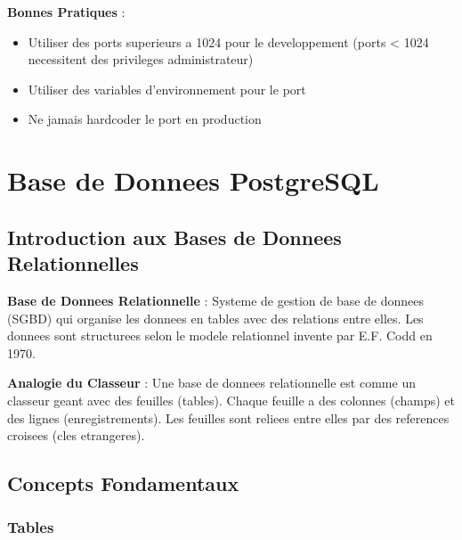 \documentclass[a4paper,12pt]{book}
\begin{document}
\begin{bestpracticebox}
    \textbf{Bonnes Pratiques} :
    \begin{itemize}
        \item Utiliser des ports superieurs a 1024 pour le developpement (ports < 1024 necessitent des privileges administrateur)
        \item Utiliser des variables d'environnement pour le port
        \item Ne jamais hardcoder le port en production
    \end{itemize}
\end{bestpracticebox}

\chapter{Base de Donnees PostgreSQL}

\section{Introduction aux Bases de Donnees Relationnelles}

\begin{definitionbox}
    \textbf{Base de Donnees Relationnelle} : Systeme de gestion de base de donnees (SGBD) qui organise les donnees en tables avec des relations entre elles. Les donnees sont structurees selon le modele relationnel invente par E.F. Codd en 1970.
\end{definitionbox}

\begin{analogybox}
    \textbf{Analogie du Classeur} : Une base de donnees relationnelle est comme un classeur geant avec des feuilles (tables). Chaque feuille a des colonnes (champs) et des lignes (enregistrements). Les feuilles sont reliees entre elles par des references croisees (cles etrangeres).
\end{analogybox}

\section{Concepts Fondamentaux}

\subsection{Tables}
\end{document}
